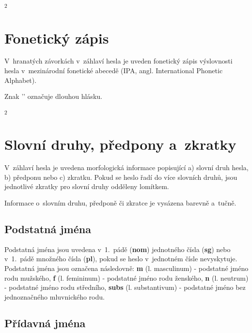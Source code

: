 \blspace
  \dicEntry {}\textsuperscript{2} \dicsymFrequent
\blspace

\section{Fonetický zápis}

V~hranatých závorkách v~záhlaví hesla je uveden fonetický zápis výslovnosti hesla v~mezinárodní fonetické abecedě (IPA, angl. International Phonetic Alphabet).

\blspace
  \dicEntry {} 
\blspace

Znak '{\textlengthmark}' označuje dlouhou hlásku.

\blspace
  \dicEntry {}\textsuperscript{2} 
\blspace

\section{Slovní druhy, předpony a~zkratky}

V~záhlaví hesla je uvedena morfologická informace popisující a) slovní druh hesla, b) předponu nebo c) zkratku. Pokud se heslo řadí do více slovních druhů, jsou jednotlivé zkratky pro slovní druhy odděleny lomítkem.

\blspace
  \dicEntry {} 
\blspace

Informace o~slovním druhu, předponě či zkratce je vysázena barevně a~tučně.

\subsection*{Podstatná jména}

Podstatná jména jsou uvedena v~1.~pádě (\textbf{nom}) jednotného čísla (\textbf{sg}) nebo v~1.~pádě množného čísla (\textbf{pl}), pokud se heslo v~jednotném čísle nevyskytuje. Podstatná jména jsou označena následovně: \textbf{m} (l. masculinum) - podstatné jméno rodu mužského,
\textbf{f} (l. femininum) - podstatné jméno rodu ženského, \textbf{n} (l. neutrum) - podstatné jméno rodu středního, \textbf{subs} (l. substantivum) - podstatné jméno bez jednoznačného mluvnického rodu.

\blspace
  \dicEntry {} 
  \dicEntry {} 
\blspace

\subsection*{Přídavná jména}

